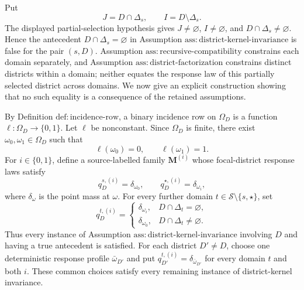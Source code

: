 Put
\[
J=D\cap\Delta_s,
\qquad
I=D\setminus\Delta_s.
\]
The displayed partial-selection hypothesis gives \(J\ne\varnothing\), \(I\ne\varnothing\), and \(D\cap\Delta_s\ne\varnothing\).  Hence the antecedent \(D\cap\Delta_s=\varnothing\) in Assumption \(\mathrm{ass:district\text{-}kernel\text{-}invariance}\) is false for the pair \((s,D)\).  Assumption \(\mathrm{ass:recursive\text{-}compatibility}\) constrains each domain separately, and Assumption \(\mathrm{ass:district\text{-}factorization}\) constrains distinct districts within a domain; neither equates the response law of this partially selected district across domains.  We now give an explicit construction showing that no such equality is a consequence of the retained assumptions.

By Definition \(\mathrm{def:incidence\text{-}row}\), a binary incidence row on \(\Omega_D\) is a function \(\ell:\Omega_D\to\{0,1\}\).  Let \(\ell\) be nonconstant.  Since \(\Omega_D\) is finite, there exist \(\omega_0,\omega_1\in\Omega_D\) such that
\[
\ell(\omega_0)=0,
\qquad
\ell(\omega_1)=1.
\tag{1}
\]
For \(i\in\{0,1\}\), define a source-labelled family \(\mathbf M^{(i)}\) whose focal-district response laws satisfy
\[
q_D^{s,(i)}=\delta_{\omega_0},
\qquad
q_D^{\star,(i)}=\delta_{\omega_i},
\tag{2}
\]
where \(\delta_\omega\) is the point mass at \(\omega\).  For every further domain \(t\in\mathcal S\setminus\{s,\star\}\), set
\[
q_D^{t,(i)}=
\begin{cases}
\delta_{\omega_i},&D\cap\Delta_t=\varnothing,\\
\delta_{\omega_0},&D\cap\Delta_t\ne\varnothing.
\end{cases}
\tag{3}
\]
Thus every instance of Assumption \(\mathrm{ass:district\text{-}kernel\text{-}invariance}\) involving \(D\) and having a true antecedent is satisfied.  For each district \(D'\ne D\), choose one deterministic response profile \(\bar\omega_{D'}\) and put \(q_{D'}^{t,(i)}=\delta_{\bar\omega_{D'}}\) for every domain \(t\) and both \(i\).  These common choices satisfy every remaining instance of district-kernel invariance.

